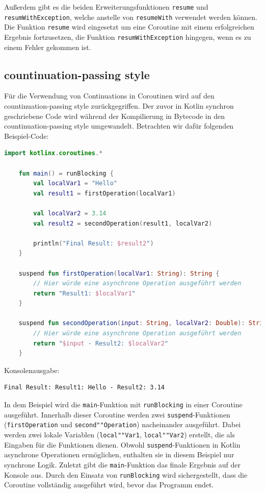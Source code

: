 \documentclass[fontsize=12pt,paper=a4,twoside=semi,parskip=half-,headsepline,headinclude]{scrreprt}
\begin{document}
Außerdem gibt es die beiden Erweiterungsfunktionen \texttt{resume} und \texttt{resumWithException}, welche anstelle von \texttt{resumeWith} verwendet werden können. Die Funktion \texttt{resume} wird eingesetzt um eine Coroutine mit einem erfolgreichen Ergebnis fortzusetzen, die Funktion \texttt{resumWithException} hingegen, wenn es zu einem Fehler gekommen ist.


\subsection{countinuation-passing style}
\label{subsec:csp}

Für die Verwendung von Continuations in Coroutinen wird auf den countinuation-passing style\cite{sus75} zurückgegriffen. Der zuvor in Kotlin synchron geschriebene Code wird während der Kompilierung in Bytecode in den countinuation-passing style umgewandelt\cite{Elizarov2017b}. Betrachten wir dafür folgenden Beispiel-Code:

\begin{lstlisting}[language=Kotlin]
	import kotlinx.coroutines.*

	fun main() = runBlocking {
		val localVar1 = "Hello"
		val result1 = firstOperation(localVar1)
	
		val localVar2 = 3.14
		val result2 = secondOperation(result1, localVar2)
	
		println("Final Result: $result2")
	}

	suspend fun firstOperation(localVar1: String): String {
		// Hier würde eine asynchrone Operation ausgeführt werden
		return "Result1: $localVar1"
	}

	suspend fun secondOperation(input: String, localVar2: Double): String {
		// Hier würde eine asynchrone Operation ausgeführt werden
		return "$input - Result2: $localVar2"
	}
\end{lstlisting}
Konsolenausgabe:
\begin{lstlisting}[frame=shadowbox, rulecolor=\color{black}, backgroundcolor=\color{gray!10}]
	Final Result: Result1: Hello - Result2: 3.14
\end{lstlisting}

In dem Beispiel wird die \texttt{main}-Funktion mit \texttt{runBlocking} in einer Coroutine ausgeführt. Innerhalb dieser Coroutine werden zwei \texttt{suspend}-Funktionen (\texttt{firstOperation} und \texttt{second""Operation}) nacheinander ausgeführt. Dabei werden zwei lokale Variablen (\texttt{local""Var1}, \texttt{local""Var2}) erstellt, die als Eingaben für die Funktionen dienen. Obwohl \texttt{suspend}-Funktionen in Kotlin asynchrone Operationen ermöglichen, enthalten sie in diesem Beispiel nur synchrone Logik. Zuletzt gibt die \texttt{main}-Funktion das finale Ergebnis auf der Konsole aus. Durch den Einsatz von \texttt{runBlocking} wird sichergestellt, dass die Coroutine vollständig ausgeführt wird, bevor das Programm endet.
\end{document}
